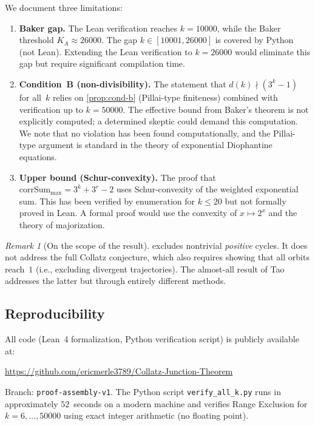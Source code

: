 \documentclass[11pt, a4paper]{amsart}
\theoremstyle{plain}
\theoremstyle{definition}
\theoremstyle{remark}
\newtheorem{remark}[theorem]{Remark}
\newcommand{\corrSum}{\mathrm{corrSum}}
\begin{document}
We document three limitations:

\begin{enumerate}
  \item \textbf{Baker gap.}
    The Lean verification reaches $k = 10000$, while the
    Baker threshold $K_A \approx 26000$.  The gap
    $k \in [10001, 26000]$ is covered by Python (not Lean).
    Extending the Lean verification to $k = 26000$ would
    eliminate this gap but require significant compilation time.

  \item \textbf{Condition~B (non-divisibility).}
    The statement that $d(k) \nmid (3^k - 1)$ for all~$k$
    relies on \cref{prop:cond-b} (Pillai-type finiteness)
    combined with verification up to $k = 50000$.  The effective
    bound from Baker's theorem is not explicitly computed; a
    determined skeptic could demand this computation.  We note
    that no violation has been found computationally, and the
    Pillai-type argument is standard in the theory of exponential
    Diophantine equations.

  \item \textbf{Upper bound (Schur-convexity).}
    The proof that $\corrSum_{\max} = 3^k + 3^r - 2$ uses
    Schur-convexity of the weighted exponential sum.  This has
    been verified by enumeration for $k \leq 20$ but not formally
    proved in Lean.  A formal proof would use the convexity of
    $x \mapsto 2^x$ and the theory of majorization.
\end{enumerate}

\begin{remark}[On the scope of the result]\label{rem:scope-discussion}
   excludes nontrivial \emph{positive} cycles.
  It does not address the full Collatz conjecture, which also
  requires showing that all orbits reach~$1$ (i.e., excluding
  divergent trajectories).  The almost-all result of
  Tao~\cite{Tao2022} addresses the latter but through entirely
  different methods.
\end{remark}

\subsection{Reproducibility}\label{ssec:reproducibility}

All code (Lean~4 formalization, Python verification script) is
publicly available at:
\begin{center}
  \url{https://github.com/ericmerle3789/Collatz-Junction-Theorem}
\end{center}
Branch: \texttt{proof-assembly-v1}.
The Python script \texttt{verify\_all\_k.py} runs in approximately
$52$~seconds on a modern machine and verifies Range Exclusion for
$k = 6, \ldots, 50000$ using exact integer arithmetic (no floating
point).
\end{document}
